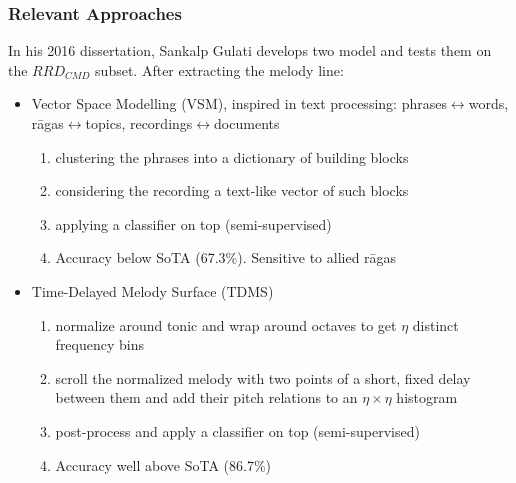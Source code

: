 \documentclass[hyperref={pdfpagelabels=false}]{beamer}
\begin{document}
     \begin{frame}
       \frametitle{Relevant Approaches}
       In his 2016 dissertation, Sankalp Gulati develops two model and tests them on the $RRD_{CMD}$ subset. After extracting the melody line:
       \vspace{3mm}
       \begin{itemize}[<.->]
       \item Vector Space Modelling (VSM)\cite[p.179]{gulati}, inspired in text processing: phrases$\leftrightarrow$words, r\=agas$\leftrightarrow$topics, recordings$\leftrightarrow$documents
         \begin{enumerate}[<.->]
         \item clustering the phrases into a dictionary of building blocks\cite[p.204]{gulati}
         \item considering the recording a text-like vector of such blocks
         \item applying a classifier on top (semi-supervised)
         \item Accuracy below SoTA (67.3\%). Sensitive to allied r\=agas
         \end{enumerate}
         \vspace{3mm}
       \item Time-Delayed Melody Surface (TDMS)\cite[p.192]{gulati}
         \begin{enumerate}[<.->]
         \item normalize around tonic and wrap around octaves to get $\eta$ distinct frequency bins
         \item scroll the normalized melody with two points of a short, fixed delay between them and add their pitch relations to an $\eta\times\eta$ histogram
         \item post-process and apply a classifier on top (semi-supervised)
         \item Accuracy well above SoTA (86.7\%)
         \end{enumerate}
       \end{itemize}
     \end{frame}
\end{document}
